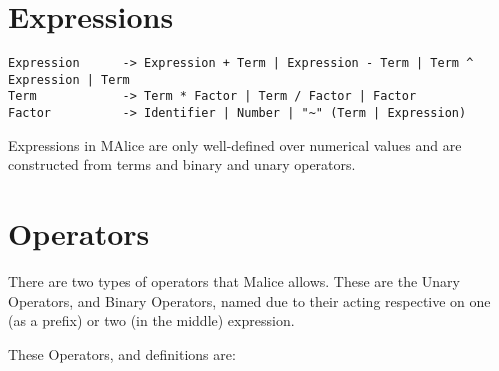 \documentclass[a4wide, 11pt]{article}
\begin{document}
\section{Expressions}

\begin{verbatim}
Expression      -> Expression + Term | Expression - Term | Term ^ Expression | Term
Term            -> Term * Factor | Term / Factor | Factor
Factor          -> Identifier | Number | "~" (Term | Expression)

\end{verbatim}

Expressions in MAlice are only well-defined over numerical values and are constructed from terms and binary and unary operators.

\section{Operators}

There are two types of operators that Malice allows. These are the Unary Operators, and Binary Operators, named due to their acting respective on one (as a prefix) or two (in the middle) expression.

These Operators, and definitions are:
\end{document}
